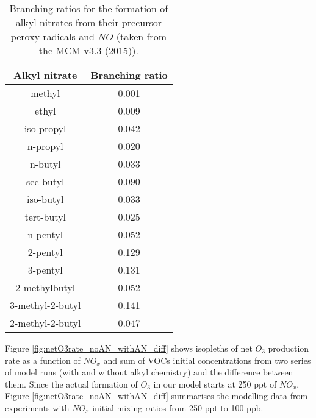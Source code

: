 \documentclass[11pt,a4paper]{article}
\begin{document}
\begin{table}[h!] %
\caption{Branching ratios for the formation of alkyl nitrates from their precursor peroxy radicals and $NO$ (taken from the MCM v3.3 (2015)).}
\label{tab:ANbranching}
\centering
\begin{tabular}{cc}
\hline
Alkyl nitrate    & Branching ratio \\
\hline
methyl           & 0.001 \\
ethyl            & 0.009 \\
iso-propyl       & 0.042 \\
n-propyl         & 0.020 \\
n-butyl          & 0.033 \\
sec-butyl        & 0.090 \\
iso-butyl        & 0.033 \\ 
tert-butyl       & 0.025 \\
n-pentyl         & 0.052 \\
2-pentyl         & 0.129 \\
3-pentyl         & 0.131 \\
2-methylbutyl    & 0.052 \\
3-methyl-2-butyl & 0.141 \\
2-methyl-2-butyl & 0.047 \\
\hline
\end{tabular}
\end{table}

Figure \ref{fig:netO3rate_noAN_withAN_diff} shows isopleths of net $O_3$ production rate as a function of $NO_x$ and sum of VOCs initial concentrations from two series of model runs (with and without alkyl chemistry) and the difference between them. Since the actual formation of $O_3$ in our model starts at 250 ppt of $NO_x$, Figure \ref{fig:netO3rate_noAN_withAN_diff} summarises the modelling data from experiments with $NO_x$ initial mixing ratios from 250 ppt to 100 ppb.
\end{document}
